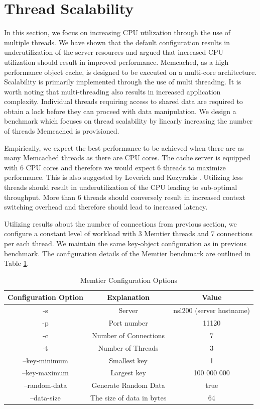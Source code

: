 
\section{Thread Scalability}
\label{sec:memcached-threads}
In this section, we focus on increasing CPU utilization through the use of multiple threads. We have shown that the default configuration results in underutilization of the server resources and argued that increased CPU utilization should result in improved performance. Memcached, as a high performance object cache, is designed to be executed on a multi-core architecture. Scalability is primarily implemented through the use of multi threading. It is worth noting that multi-threading also results in increased application complexity. Individual threads requiring access to shared data are required to obtain a lock before they can proceed with data manipulation. We design a benchmark which focuses on thread scalability by linearly increasing the number of threads Memcached is provisioned.

Empirically, we expect the best performance to be achieved when there are as many Memcached threads as there are CPU cores. The cache server is equipped with 6 CPU cores and therefore we would expect 6 threads to maximize performance. This is also suggested by Leverich and Kozyrakis \cite{leverich2014reconciling}. Utilizing less threads should result in underutilization of the CPU leading to sub-optimal throughput. More than 6 threads should conversely result in increased context switching overhead and therefore should lead to increased latency.

Utilizing results about the number of connections from previous section, we configure a constant level of workload with 3 Memtier threads and 7 connections per each thread. We maintain the same key-object configuration as in previous benchmark. The configuration details of the Memtier benchmark are outlined in Table \ref{tab:m_threads_memtier}.

\begin{table}[h!]
\centering
\begin{tabular}{| c c c |}
 \hline
 Configuration Option & Explanation & Value\\ [0.5ex]
 \hline\hline

 -s & Server & nsl200 (server hostname) \\
 -p & Port number & 11120 \\
 -c & Number of Connections & 7 \\
 -t & Number of Threads & 3 \\
 --key-minimum & Smallest key & 1 \\
 --key-maximum & Largest key & 100 000 000 \\
 --random-data & Generate Random Data & true \\
 --data-size & The size of data in bytes & 64 \\

 \hline

\end{tabular}
\caption{Memtier Configuration Options}
\label{tab:m_threads_memtier}
\end{table}

